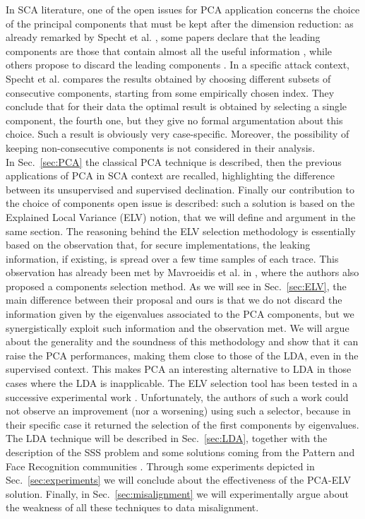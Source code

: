  In SCA literature, one of the open issues for PCA application concerns the choice of the principal components that must be kept after the dimension reduction: as already remarked by Specht et al.  \cite{specht}, some papers declare that the leading components are those that contain almost all the useful information \cite{TAprincipal,choudary2014efficient}, while others propose to discard the leading components \cite{Batina2012}. In a specific attack context, Specht et al. compares the results obtained by choosing different subsets of consecutive components, starting from some empirically chosen index. They conclude that for their data the optimal result is obtained by selecting a single component, the fourth one, but they give no formal argumentation about this choice. Such a result is obviously very case-specific. Moreover, the possibility of keeping non-consecutive components is not considered in their analysis. \\

 
In Sec.~\ref{sec:PCA} the classical PCA technique is described, then the previous applications of PCA in SCA context are recalled, highlighting the difference between its unsupervised and supervised declination. Finally our contribution to the choice of components open issue is described: such a solution is based on the Explained Local Variance (ELV) notion, that we will define and argument in the same section. The reasoning behind the ELV selection methodology is essentially based on the observation that, for secure implementations, the leaking information, if existing, is spread over a few time samples of each trace. This observation has already been met by Mavroeidis et al. in \cite{SCAclassProbl}, where the authors  also proposed a components selection method. As we will see in Sec.~\ref{sec:ELV}, the main difference between their proposal and ours is that we do not discard the information given by the eigenvalues associated to the PCA components, but we synergistically exploit such information and the observation met.  We will argue about the generality and the soundness of this methodology and show that it can raise the PCA performances, making them close to those of the LDA, even in the supervised context. This makes PCA an interesting alternative to LDA in those cases where the LDA is inapplicable. The ELV selection tool has been tested in a successive experimental work \cite{choudary2018efficient}. Unfortunately, the authors of such a work could not observe an improvement (nor a worsening) using such a selector, because in their specific case it returned the selection of the first components by eigenvalues. The LDA technique will be described in Sec.~\ref{sec:LDA}, together with the description of the SSS problem and some solutions coming from the Pattern and Face Recognition communities \cite{eigenfaces,Chen2000,huang,Yu01adirect}. Through some experiments depicted in Sec.~\ref{sec:experiments} we will conclude about the effectiveness of the PCA-ELV solution. Finally, in Sec.~\ref{sec:misalignment} we will experimentally argue about the weakness of all these techniques to data misalignment.


